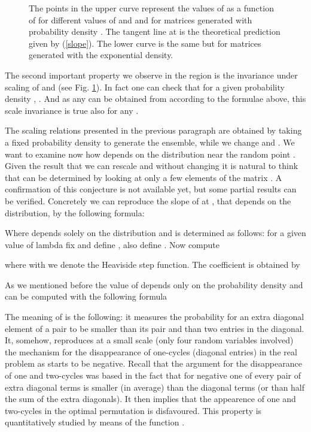 \documentclass[]{iopart}
\begin{document}
\begin{figure}[h!]
\caption{\small The points in the upper curve represent the  values of  
as a function of  for different values of 
 and  and for matrices generated with probability density . The 
 tangent line at  is the  theoretical prediction given by
 (\ref{slope}). The lower curve is the same
 but for matrices generated with the exponential density.}
\label{q1}
\end{figure}
The second important property we observe in the region  
is the invariance under scaling of  and  (see Fig. \ref{q1}). In fact 
one can check that for a given probability density , 
.
And as any  can be obtained
from  according to the formulae above, this 
scale invariance is true also for any .

The scaling relations presented in the previous paragraph are obtained  
by taking a fixed probability density 
to generate the ensemble, while we change 
 and . We want to examine now how
 depends on the distribution near
the random point . Given the result that we can 
rescale  and  without changing 
it is natural to think that  can be determined by 
looking at only a few elements of the matrix .
A confirmation of this conjecture is not available yet, but
some partial results can be verified. Concretely
we can reproduce the slope of  at ,
that depends on the distribution,
by the following formula:  

Where  depends solely on the distribution and is 
determined as follows:\hfill\break
for a given value of lambda fix  
and define , 
also define . Now 
compute 

where with  we denote the Heaviside step function. The
coefficient  is obtained by
 
As we mentioned before the value of  depends only on the 
probability density  and can be computed with the following formula

The meaning of  is the following: it measures the probability
for an extra diagonal element of a pair to be  smaller than its pair
and than two entries in the diagonal.  
It, somehow, reproduces at a small scale (only four random variables 
involved) the mechanism for the disappearance of one-cycles 
(diagonal entries) in the real problem as  starts to be 
negative. 
Recall that the argument for the disappearance of one and two-cycles
was based in the fact that for negative 
one of every pair of extra diagonal terms is smaller
(in average) than the diagonal terms
(or than half the sum of the extra diagonals).
It then implies that the appearence of one and two-cycles 
in the optimal permutation is disfavoured. This property is 
quantitatively studied by means of the function .
\end{document}
